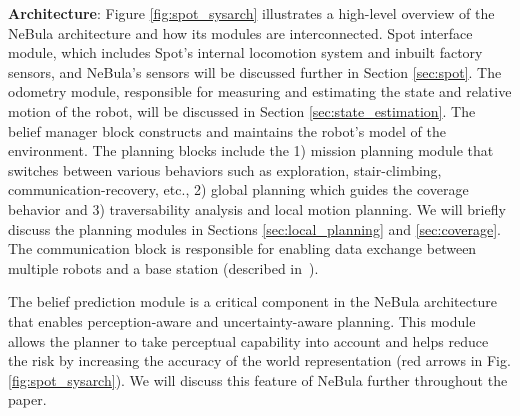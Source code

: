 \documentclass[letterpaper, 10pt, conference]{ieeeconf}      %
\newcommand{\ph}[1]{{\textbf{#1}:}} %
\newcommand{\rev}[1]{{\color{blue}#1}} %
\begin{document}
\ph{Architecture} %
Figure \ref{fig:spot_sysarch} illustrates a high-level overview of the NeBula architecture and how its modules are interconnected. 
Spot interface module, which includes Spot's internal locomotion system and inbuilt factory sensors, and NeBula's sensors will be discussed further in Section \ref{sec:spot}.
The odometry module, responsible for measuring and estimating the state and relative motion of the robot, will be discussed in Section \ref{sec:state_estimation}. 
The belief manager block constructs and maintains the robot's model of the environment. 
The planning blocks include the 1) mission planning module that switches between various behaviors such as exploration, stair-climbing, communication-recovery, etc., 2) global planning which guides the coverage behavior and 3) traversability analysis and local motion planning. We will briefly discuss the planning modules in Sections \ref{sec:local_planning} and \ref{sec:coverage}. The communication block is responsible for enabling data exchange between multiple robots and a base station (described in~\cite{Otsu2020}). 

The belief prediction module is a critical component in the NeBula architecture that enables perception-aware and uncertainty-aware planning. This module allows the planner to take perceptual capability into account and helps reduce the risk by increasing the accuracy of the world representation (red arrows in Fig. \ref{fig:spot_sysarch}). We will discuss this feature of NeBula further throughout the paper.
\end{document}
